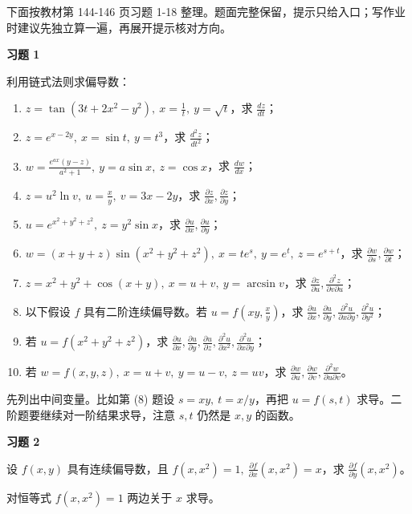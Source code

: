 下面按教材第 144-146 页习题 1-18 整理。题面完整保留，提示只给入口；写作业时建议先独立算一遍，再展开提示核对方向。

\begin{exercisebox}
\textbf{习题 1}

利用链式法则求偏导数：

\begin{enumerate}
 \item \(z=\tan(3t+2x^2-y^2),\ x=\frac1t,\ y=\sqrt t\)，求 \(\frac{dz}{dt}\)；
 \item \(z=e^{x-2y},\ x=\sin t,\ y=t^3\)，求 \(\frac{d^2z}{dt^2}\)；
 \item \(w=\frac{e^{ax}(y-z)}{a^2+1},\ y=a\sin x,\ z=\cos x\)，求 \(\frac{dw}{dx}\)；
 \item \(z=u^2\ln v,\ u=\frac{x}{y},\ v=3x-2y\)，求 \(\frac{\partial z}{\partial x},\frac{\partial z}{\partial y}\)；
 \item \(u=e^{x^2+y^2+z^2},\ z=y^2\sin x\)，求 \(\frac{\partial u}{\partial x},\frac{\partial u}{\partial y}\)；
 \item \(w=(x+y+z)\sin(x^2+y^2+z^2),\ x=te^s,\ y=e^t,\ z=e^{s+t}\)，求 \(\frac{\partial w}{\partial s},\frac{\partial w}{\partial t}\)；
 \item \(z=x^2+y^2+\cos(x+y),\ x=u+v,\ y=\arcsin v\)，求 \(\frac{\partial z}{\partial u},\frac{\partial^2 z}{\partial v\partial u}\)；
 \item 以下假设 \(f\) 具有二阶连续偏导数。若 \(u=f\!\left(xy,\frac{x}{y}\right)\)，求 \(\frac{\partial u}{\partial x},\frac{\partial u}{\partial y},\frac{\partial^2u}{\partial x\partial y},\frac{\partial^2u}{\partial y^2}\)；
 \item 若 \(u=f(x^2+y^2+z^2)\)，求 \(\frac{\partial u}{\partial x},\frac{\partial u}{\partial y},\frac{\partial u}{\partial z},\frac{\partial^2u}{\partial x^2},\frac{\partial^2u}{\partial x\partial y}\)；
 \item 若 \(w=f(x,y,z),\ x=u+v,\ y=u-v,\ z=uv\)，求 \(\frac{\partial w}{\partial u},\frac{\partial w}{\partial v},\frac{\partial^2w}{\partial u\partial v}\)。
 \end{enumerate}

\begin{hintbox}
先列出中间变量。比如第 (8) 题设 \(s=xy,\ t=x/y\)，再把 \(u=f(s,t)\) 求导。二阶题要继续对一阶结果求导，注意 \(s,t\) 仍然是 \(x,y\) 的函数。
\end{hintbox}
\end{exercisebox}

\begin{exercisebox}
\textbf{习题 2}

设 \(f(x,y)\) 具有连续偏导数，且 \(f(x,x^2)=1,\ \frac{\partial f}{\partial x}(x,x^2)=x\)，求 \(\frac{\partial f}{\partial y}(x,x^2)\)。

\begin{hintbox}
对恒等式 \(f(x,x^2)=1\) 两边关于 \(x\) 求导。
\end{hintbox}
\end{exercisebox}

